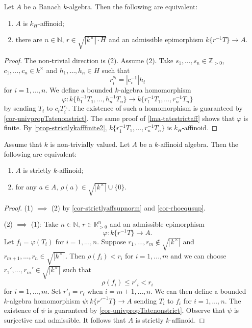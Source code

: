 \begin{proposition}\label{prop-affkhchar1}
    Let $A$ be a Banach $k$-algebra. Then the following are equivalent:
    \begin{enumerate}
        \item $A$ is $k_H$-affinoid;
        \item there are $n\in \mathbb{N}$, $r\in \sqrt{|k^{\times}|\cdot H}$ and an admissible epimorphism $k\{r^{-1}T\}\rightarrow A$.
    \end{enumerate}
\end{proposition}
\begin{proof}
    The non-trivial direction is (2). Assume (2).
    Take $s_1,\ldots,s_n\in \mathbb{Z}_{>0}$, $c_1,\ldots,c_n\in k^{\times}$ and $h_1,\ldots,h_n\in H$ such that
    \[
        r_i^{s_i}=|c_i^{-1}|h_i  
    \]
    for $i=1,\ldots,n$. We define a bounded $k$-algebra homomorphism
    \[
        \varphi:k\{h_1^{-1}T_1,\ldots,h_n^{-1}T_n\}\rightarrow k\{r_1^{-1}T_1,\ldots,r_n^{-1}T_n\}  
    \]
    by sending $T_i$ to $c_i T_i^{s_i}$. The existence of such a homomorphism is guaranteed by \cref{cor-univpropTatenonstrict}. The same proof of \cref{lma-tatestrictaff} shows that $\varphi$ is finite. By \cref{prop-strictlykafffinite2}, $k\{r_1^{-1}T_1,\ldots,r_n^{-1}T_n\}  $ is $k_H$-affinoid.
\end{proof}


\begin{lemma}\label{lma-strictlykaffintermsofrho}
    Assume that $k$ is non-trivially valued.
    Let $A$ be a $k$-affinoid algebra. Then the following are equivalent:
    \begin{enumerate}
        \item $A$ is strictly $k$-affinoid;
        \item for any $a\in A$, $\rho(a)\in \sqrt{|k^{\times}|}\cup\{0\}$.
    \end{enumerate}
\end{lemma}
\begin{proof}
    (1) $\implies$ (2) by \cref{cor-strictlyaffsupnorm} and \cref{cor-rhoequsup}.

    (2) $\implies$ (1): Take $n\in \mathbb{N}$, $r\in \mathbb{R}^n_{>0}$ and  an admissible epimorphism 
    \[
        \varphi:k\{r^{-1}T\}\rightarrow A.  
    \]
    Let $f_i=\varphi(T_i)$ for $i=1,\ldots,n$. Suppose $r_1,\ldots,r_m\not\in \sqrt{|k^{\times}|}$ and $r_{m+1},\ldots,r_n\in \sqrt{|k^{\times}|}$. Then $\rho(f_i)<r_i$ for $i=1,\ldots,m$ and we can choose $r_1',\ldots,r_m'\in \sqrt{|k^{\times}|}$ such that 
    \[
        \rho(f_i)\leq r'_i<r_i
    \]
    for $i=1,\ldots,m$. Set $r'_i=r_i$ when $i=m+1,\ldots,n$. We can then define a bounded $k$-algebra homomorphism $\psi:k\{r'^{-1}T\}\rightarrow A$ sending $T_i$ to $f_i$ for $i=1,\ldots,n$. The existence of $\psi$ is guaranteed by \cref{cor-univpropTatenonstrict}. Observe that $\psi$ is surjective and admissible. It follows that $A$ is strictly $k$-affinoid.
\end{proof}

